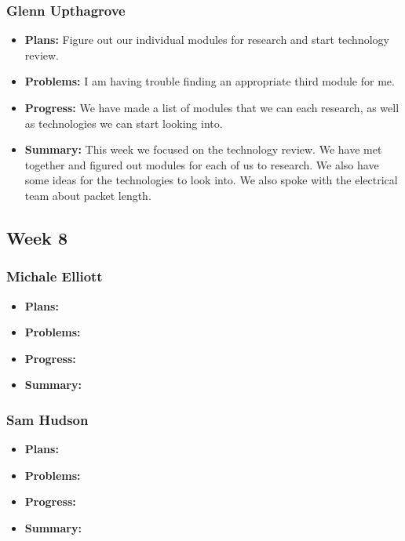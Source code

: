 \documentclass[onecolumn, draftclsnofoot,10pt, compsoc]{IEEEtran}
\begin{document}
\subsubsection{Glenn Upthagrove}
\begin {itemize}
 \item \textbf{Plans: }Figure out our individual modules for research and start technology review.
 \item \textbf{Problems: }I am having trouble finding an appropriate third module for me. 
 \item \textbf{Progress: }We have made a list of modules that we can each research, as well as technologies we can start looking into. 
 \item \textbf{Summary: }This week we focused on the technology review. We have met together and figured out modules for each of us to research. We also have some ideas for the technologies to look into. We also spoke with the electrical team about packet length. 
\end {itemize}
\subsection {Week 8}
\subsubsection{Michale Elliott}
\begin {itemize}
 \item \textbf{Plans: }
 \item \textbf{Problems: }
 \item \textbf{Progress: }
 \item \textbf{Summary: }
\end {itemize}
\subsubsection{Sam Hudson}
\begin {itemize}
 \item \textbf{Plans: }
 \item \textbf{Problems: }
 \item \textbf{Progress: }
 \item \textbf{Summary: }
\end {itemize}
\end{document}
